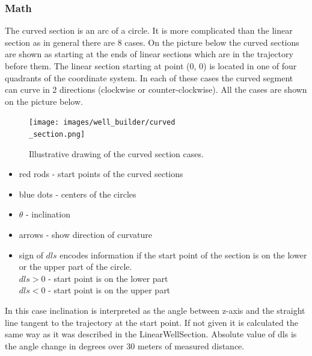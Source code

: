 	\subsubsection{Math}
	The curved section is an arc of a circle. It is more complicated than the linear section as in general there are 8 cases. On the picture below the curved sections are shown as starting at the ends of linear sections which are in the trajectory before them. The linear section starting at point (0, 0) is located in one of four quadrants of the coordinate system. In each of these cases the curved segment can curve in 2 directions (clockwise or counter-clockwise). All the cases are shown on the picture below.
	\begin{figure}[H]
		\centering
		\texttt{[image: images/well\_builder/curved\\\_section.png]}
		\caption{Illustrative drawing of the curved section cases.}
		\label{curved_section}
	\end{figure}
	\begin{itemize}
		\item red rods - start points of the curved sections
		\item blue dots - centers of the circles
		\item $\theta$ - inclination
		\item arrows - show direction of curvature
		\item sign of $dls$ encodes information if the start point of the section is on the lower or the upper part of the circle.\\
		$dls > 0$ - start point is on the lower part\\
		$dls < 0$ - start point is on the upper part\\
	\end{itemize}
	In this case inclination is interpreted as the angle between z-axis and the straight line tangent to the trajectory at the start point. If not given it is calculated the same way as it was described in the LinearWellSection. Absolute value of dls is the angle change in degrees over 30 meters of measured distance.\newline

